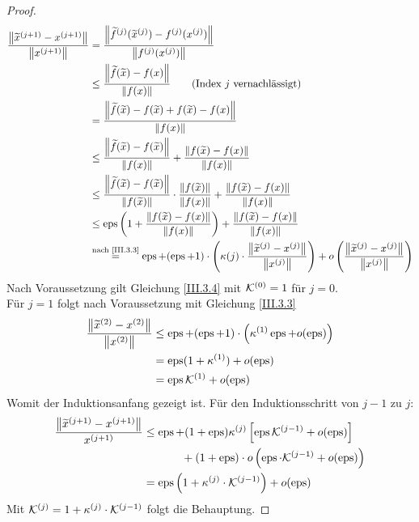 \begin{proof}
  \begin{align*}
    \frac{\nn[\widetilde{x}^{(j+1)}-x^{(j+1)}]}{\nn[x^{(j+1)}]}
    &= \frac{\nn[\widetilde{f}^{(j)}(\widetilde{x}^{(j)})-f^{(j)}(x^{(j)})]}
      {\nn[f^{(j)}(x^{(j)})]} \\
    &\leq \frac{\nn[\widetilde{f}(\widetilde{x})-f(x)]}
      {\nn[f(x)]}
      \qquad \text{(Index $j$ vernachlässigt)}\\
    &= \frac{\nn[\widetilde{f}(\widetilde{x})-f(\widetilde{x})
      +f(\widetilde{x}) - f(x)]}
      {\nn[f(x)]}\\
    &\leq \frac{\nn[\widetilde{f}(\widetilde{x})-f(\widetilde{x})]}{\nn[f(x)]}
      + \frac{\nn[f(\widetilde{x})-f({x})]}{\nn[f(x)]} \\
    &\leq \frac{\nn[\widetilde{f}(\widetilde{x})-f(\widetilde{x})]}{\nn[f(\widetilde{x})]}
      \cdot \frac{\nn[f(\widetilde{x})]}{\nn[f(x)]}
      + \frac{\nn[f(\widetilde{x})-f({x})]}{\nn[f(x)]} \\
    &\leq \Eps \left( 1+ \frac{\nn[f(\widetilde{x})-f({x})]}{\nn[f(x)]}\right)
      + \frac{\nn[f(\widetilde{x})-f({x})]}{\nn[f(x)]}\\
    &\overset{\text{nach \ref{III.3.3}}}{=} \Eps + (\Eps+1) \cdot 						\left(\kappa{(j)}\cdot \frac{\nn[\widetilde{x}^{(j)}-x^{(j)}]}{\nn[x^{(j)}]}\right)
      + o\left( \frac{\nn[\widetilde{x}^{(j)}-x^{(j)}]}{\nn[x^{(j)}]}\right)
  \end{align*}
  Nach Voraussetzung gilt Gleichung \eqref{III.3.4}  mit $\K^{(0)}=1$ für $j=0$. \\
  Für $j=1$ folgt nach Voraussetzung mit Gleichung \eqref{III.3.3}
  \begin{align*}
    \frac{\nn[\widetilde{x}^{(2)}-x^{(2)}]}{\nn[x^{(2)}]}
    & \leq \Eps +(\Eps+1) \cdot \left( \kappa^{(1)}\Eps+ o(\Eps)\right) \\
    &= \Eps(1+\kappa^{(1)}) + o(\Eps) \\
    &= \Eps\K^{(1)} + o(\Eps)
  \end{align*}
  Womit der Induktionsanfang gezeigt ist.
  Für den Induktionsschritt von $j-1$ zu $j$:
  \begin{align*}
    \frac{\nn[\widetilde{x}^{(j+1)}-x^{(j+1)}]}{x^{(j+1)}}
    & \leq \Eps + (1+\Eps)\kappa^{(j)} \left[ \Eps \K^{(j-1)}+ o(\Eps) \right] \\
    &\phantom{\leq \Eps+} + (1+\Eps) \cdot o\left( \Eps\cdot \K^{(j-1)} +o(\Eps)\right) \\
    &= \Eps\left(1+\kappa^{(j)}\cdot \K^{(j-1)}\right)+ o(\Eps)
  \end{align*}
  Mit $\K^{(j)} = 1+ \kappa^{(j)}\cdot \K^{(j-1)}$ folgt die Behauptung.
\end{proof}

